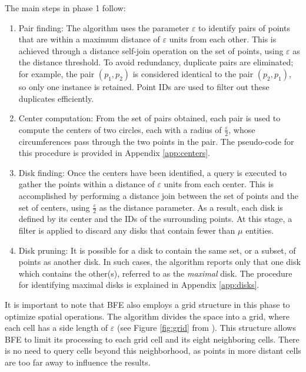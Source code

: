 The main steps in phase 1 follow:
\begin{enumerate}
    \item Pair finding:  The algorithm uses the parameter $\varepsilon$ to identify pairs of points that are within a maximum distance of $\varepsilon$ units from each other. This is achieved through a distance self-join operation on the set of points, using $\varepsilon$ as the distance threshold. To avoid redundancy, duplicate pairs are eliminated; for example, the pair $(p_1, p_2)$ is considered identical to the pair $(p_2, p_1)$, so only one instance is retained. Point IDs are used to filter out these duplicates efficiently.
    \item Center computation:  From the set of pairs obtained, each pair is used to compute the centers of two circles, each with a radius of $\frac{\varepsilon}{2}$, whose circumferences pass through the two points in the pair. The pseudo-code for this procedure is provided in Appendix \ref{app:centers}.
    \item Disk finding: Once the centers have been identified, a query is executed to gather the points within a distance of $\varepsilon$ units from each center. This is accomplished by performing a distance join between the set of points and the set of centers, using $\frac{\varepsilon}{2}$ as the distance parameter. As a result, each disk is defined by its center and the IDs of the surrounding points. At this stage, a filter is applied to discard any disks that contain fewer than $\mu$ entities.
    \item Disk pruning: It is possible for a disk to contain the same set, or a subset, of points as another disk. In such cases, the algorithm reports only that one disk which contains the other(s), referred to as the \textit{maximal} disk. The procedure for identifying maximal disks is explained in Appendix \ref{app:disks}.
\end{enumerate}

It is important to note that BFE also employs a grid structure in this phase to optimize spatial operations. The algorithm divides the space into a grid, where each cell has a side length of $\varepsilon$ (see Figure \ref{fig:grid} from \cite{vieira_2009}). This structure allows BFE to limit its processing to each grid cell and its eight neighboring cells. There is no need to query cells beyond this neighborhood, as points in more distant cells are too far away to influence the results.

